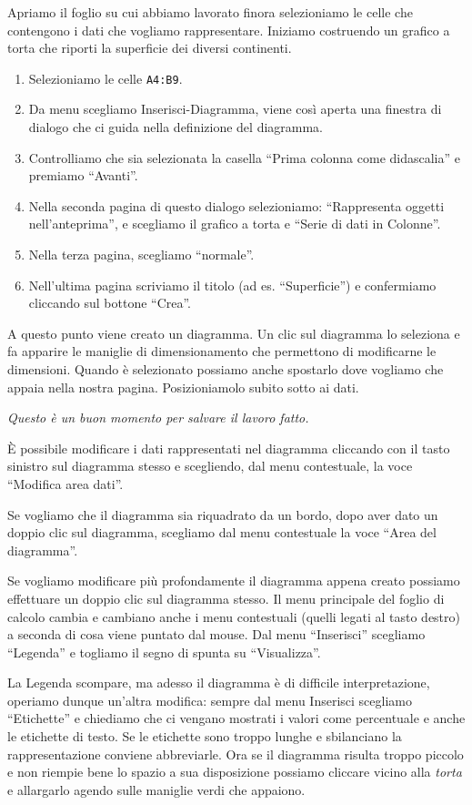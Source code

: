 Apriamo il foglio su cui abbiamo lavorato finora selezioniamo le celle che
contengono i dati che vogliamo rappresentare.
Iniziamo costruendo un grafico a torta che riporti la superficie dei
diversi continenti.

\begin{enumerate} [noitemsep]
\item Selezioniamo le celle \texttt{A4:B9}.
\item Da menu scegliamo Inserisci-Diagramma, viene così aperta una finestra
di dialogo che ci guida nella definizione del diagramma.
\item Controlliamo che sia selezionata la casella
``Prima colonna come didascalia'' e premiamo ``Avanti''.
\item Nella seconda pagina di questo dialogo selezioniamo:
``Rappresenta oggetti nell'anteprima'',
e scegliamo il grafico a torta e ``Serie di dati in Colonne''.
\item Nella terza pagina, scegliamo ``normale''.
\item Nell'ultima pagina scriviamo il titolo (ad es. ``Superficie'')
e confermiamo cliccando sul bottone ``Crea''.
\end{enumerate}

A questo punto viene creato un diagramma. Un clic sul diagramma lo seleziona
e fa apparire le maniglie di dimensionamento che permettono di modificarne
le dimensioni.
Quando è selezionato possiamo anche spostarlo dove vogliamo che appaia nella
nostra pagina. Posizioniamolo subito sotto ai dati.

\emph{Questo è un buon momento per salvare il lavoro fatto.}

È possibile modificare i dati rappresentati nel diagramma cliccando con il
tasto sinistro sul diagramma stesso e scegliendo, dal menu contestuale,
la voce ``Modifica area dati''.

Se vogliamo che il diagramma sia riquadrato da un bordo, dopo aver dato un
doppio clic sul diagramma, scegliamo dal menu contestuale la voce ``Area del
diagramma''.

Se vogliamo modificare più profondamente il diagramma appena creato possiamo
effettuare un doppio clic sul diagramma stesso.
Il menu principale del foglio di calcolo cambia e cambiano anche i menu
contestuali (quelli legati al tasto destro) a seconda di cosa viene puntato
dal mouse.
Dal menu ``Inserisci'' scegliamo ``Legenda'' e togliamo il segno di spunta su
``Visualizza''.

La Legenda scompare, ma adesso il diagramma è di difficile interpretazione,
operiamo dunque un'altra modifica:
sempre dal menu Inserisci scegliamo ``Etichette'' e chiediamo che ci vengano
mostrati i valori come percentuale e anche le etichette di testo.
Se le etichette sono troppo lunghe e sbilanciano la rappresentazione conviene
abbreviarle.
Ora se il diagramma risulta troppo piccolo e non riempie bene lo spazio
a sua disposizione possiamo cliccare vicino alla \emph{torta} e allargarlo
agendo sulle maniglie verdi che appaiono.

